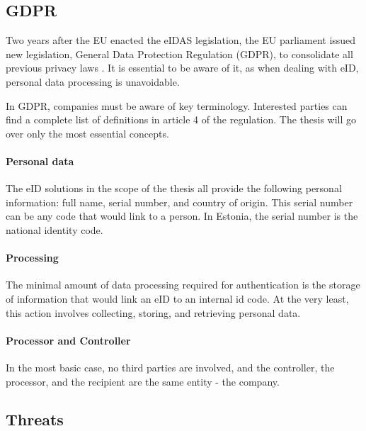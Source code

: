 \subsection{GDPR}

Two years after the EU enacted the eIDAS legislation, the EU parliament issued new legislation, General Data Protection Regulation (GDPR), to consolidate all previous privacy laws \cite{eulaw-gdpr}. It is essential to be aware of it, as when dealing with eID, personal data processing is unavoidable. 

In GDPR, companies must be aware of key terminology. Interested parties can find a complete list of definitions in article 4 of the regulation. The thesis will go over only the most essential concepts.

\paragraph{Personal data} The eID solutions in the scope of the thesis all provide the following personal information: full name, serial number, and country of origin. This serial number can be any code that would link to a person. In Estonia, the serial number is the national identity code.

\paragraph{Processing} The minimal amount of data processing required for authentication is the storage of information that would link an eID to an internal id code. At the very least, this action involves collecting, storing, and retrieving personal data.

\paragraph{Processor and Controller} In the most basic case, no third parties are involved, and the controller, the processor, and the recipient are the same entity - the company.

\subsection{Threats}


